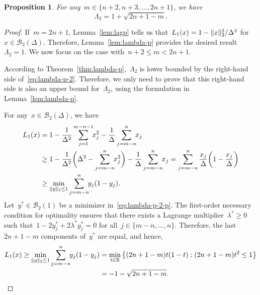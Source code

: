 \documentclass[draft]{article}
\numberwithin{equation}{section}
\theoremstyle{definition}
\theoremstyle{plain}
\newtheorem{proposition}{Proposition}[section]
\newcommand*{\lagp}[1][]{L\ifblank{#1}{}{_{#1}}}
\newcommand*{\norm}[2][]{#1\lVert#2#1\rVert}
\newcommand*{\R}{\mathbb{R}}
\newcommand*{\set}[2][]{#1\{#2#1\}}
\begin{document}
\begin{proposition}
    \label{prop:lambda-p-2}
    For any~$m \in \set{n + 2, n + 3, \dots, 2n + 1}$, we have
    \begin{equation}
        \label{eq:lambda-p-2}
        \Lambda_2 = 1 + \sqrt{2n + 1 - m}.
    \end{equation}
\end{proposition}

\begin{proof}
    If~$m = 2n + 1$, Lemma~\ref{lem:lagp} tells us that~$\lagp[1](x) = 1 - \norm{x}_2^2 / \Delta^2$ for~$x \in \mathcal{B}_2(\Delta)$.
    Therefore, Lemma~\ref{lem:lambda-p} provides the desired result~$\Lambda_2 = 1$.
    We now focus on the case with~$n + 2 \le m < 2n + 1$.

    According to Theorem~\ref{thm:lambda-p},~$\Lambda_2$ is lower bounded by the right-hand side of~\eqref{eq:lambda-p-2}.
    Therefore, we only need to prove that this right-hand side is also an upper bound for~$\Lambda_2$, using the formulation in Lemma~\ref{lem:lambda-p}.

    For any~$x \in \mathcal{B}_2(\Delta)$, we have
    \begin{align}
        \lagp[1](x) &= 1 - \frac{1}{\Delta^2} \sum_{j = 1}^{m - n - 1} \!\! x_j^2 - \frac{1}{\Delta} \sum_{j = m - n}^n \!\! x_j \nonumber\\
                    &\ge 1 - \frac{1}{\Delta^2} \bigg( \Delta^2 - \sum_{j = m - n}^n \!\! x_j^2 \bigg) - \frac{1}{\Delta} \sum_{j = m - n}^n \!\! x_j = \sum_{j = m - n}^n \frac{x_j}{\Delta} \bigg( 1 - \frac{x_j}{\Delta} \bigg) \nonumber\\
                    &\ge \min_{\norm{y}_2 \le 1} \sum_{j = m - n}^n \!\! y_j (1 - y_j). \label{eq:lambda-p-2-p}
    \end{align}
    Let~$y^{\ast} \in \mathcal{B}_2(1)$ be a minimizer in~\eqref{eq:lambda-p-2-p}.
    The first-order necessary condition for optimality ensures that there exists a Lagrange multiplier~$\lambda^{\ast} \ge 0$ such that~$1 - 2 y_j^{\ast} + 2 \lambda^{\ast} y_j^{\ast} = 0$ for all~$j \in \set{m - n, \dots, n}$.
    Therefore, the last~$2n + 1 - m$ components of~$y^{\ast}$ are equal, and hence,
    \begin{align*}
        \lagp[1](x) \ge \min_{\norm{y}_2 \le 1} \sum_{j = m - n}^n \!\! y_j (1 - y_j)   & = \min_{t \in \R} \set[\big]{(2n + 1 - m) t (1 - t) : (2n + 1 - m) t^2 \le 1}\\
                                                                                        & = -1 - \sqrt{2n + 1 - m}.
    \end{align*}


\end{proof}
\end{document}

